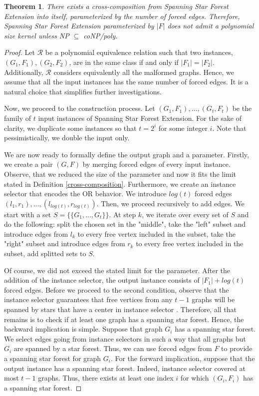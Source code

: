 \documentclass[en]{pracamgr}
\newtheorem{theorem}{Theorem}
\newcommand{\ssfep}{{\sc Spanning Star Forest Extension}}
\begin{document}
\begin{theorem}
	There exists a cross-composition from \ssfep{} into itself, parameterized by the number of forced edges. Therefore, \ssfep{} parameterized by $|F|$ does not admit a polynomial size kernel unless \textup{NP $\subseteq$ coNP/poly}.
\end{theorem}

\begin{proof}
	Let $\mathcal{R}$ be a polynomial equivalence relation such that two instances, $(G_1,F_1),(G_2, F_2)$, are in the same class if and only if $|F_1| = |F_2|$. Additionally, $\mathcal{R}$ considers equivalently all the malformed graphs. Hence, we assume that all the input instances has the same number of forced edges. It is a natural choice that simplifies further investigations.
	
	Now, we proceed to the construction process. Let $(G_1,F_1),...,(G_t,F_t)$ be the family of $t$ input instances of \ssfep{}. For the sake of clarity, we duplicate some instances so that $t = 2^i$ for some integer $i$. Note that pessimistically, we double the input only.
	
	We are now ready to formally define the output graph and a parameter. Firstly, we create a pair $(G,F)$ by merging forced edges of every input instance. Observe, that we reduced the size of the parameter and now it fits the limit stated in Definition \ref{cross-composition}. Furthermore, we create an instance selector that encodes the OR behavior. We introduce $log(t)$ forced edges $(l_1,r_1),...,(l_{log(t)},r_{log(t)})$. Then, we proceed recursively to add edges. We start with a set $S=\{\{G_1,...,G_t\}\}$. At step $k$, we iterate over every set of $S$ and do the following: split the chosen set in the "middle", take the "left" subset and introduce edges from $l_k$ to every free vertex included in the subset, take the "right" subset and introduce edges from $r_k$ to every free vertex included in the subset, add splitted sets to $S$.
	
	Of course, we did not exceed the stated limit for the parameter. After the addition of the instance selector, the output instance consists of $|F_1|+log(t)$ forced edges. Before we proceed to the second condition, observe that the instance selector guarantees that free vertices from any $t-1$ graphs will be spanned by stars that have a center in instance selector . Therefore, all that remains is to check if at least one graph has a spanning star forest. Hence, the backward implication is simple. Suppose that graph $G_i$ has a spanning star forest. We select edges going from instance selectors in such a way that all graphs but $G_i$ are spanned by a star forest. Thus, we can use forced edges from $F$ to provide a spanning star forest for graph $G_i$. For the forward implication, suppose that the output instance has a spanning star forest. Indeed, instance selector covered at most $t-1$ graphs. Thus, there exists at least one index $i$ for which $(G_i,F_i)$ has a spanning star forest.
\end{proof}
\end{document}
